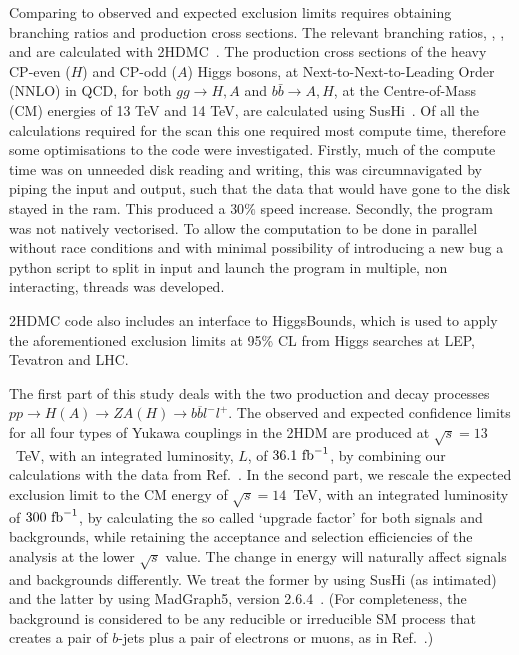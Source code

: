 Comparing to observed and expected exclusion limits requires obtaining branching ratios and production cross sections.
The relevant branching ratios, \AZH{}, \HZA{}, \Abb{} and \Hbb{} are calculated with 2HDMC~\cite{Eriksson20102HDMC}.
The production cross sections of the heavy CP-even ($H$) and CP-odd ($A$) Higgs bosons,
at Next-to-Next-to-Leading Order (NNLO) in QCD, 
for both $gg\to H,A$ and $b\bar b\to A,H$, at the Centre-of-Mass (CM) energies of 13 TeV and 14 TeV,
are calculated using SusHi~\cite{Harlander2013SusHi, Harlander2017Bento, Harlander2002nexttonext, Harlander:2003ai}. 
Of all the calculations required for the scan this one required most compute time,
therefore some optimisations to the code were investigated.
Firstly, much of the compute time was on unneeded disk reading and writing,
this was circumnavigated by piping the input and output,
such that the data that would have gone to the disk stayed in the ram.
This produced a \(30\%\) speed increase.
Secondly, the program was not natively vectorised.
To allow the computation to be done in parallel without race conditions
and with minimal possibility of introducing a new bug
a python script to split in input and launch the program in multiple,
non interacting, threads was developed.

2HDMC code also includes an interface to HiggsBounds, which is used to apply the aforementioned exclusion limits at 95\% CL from Higgs searches at LEP, Tevatron and LHC.

The first part of this study deals with the two production and decay processes \(pp \rightarrow H(A) \rightarrow ZA(H)\rightarrow b\overline{b}l^{-}l^{+}\).
The observed and expected confidence limits for all four types of Yukawa couplings in the 2HDM are produced at \(\sqrt{s}=13\)~TeV, with an integrated luminosity, $L$, of \(36.1~{\rm fb}^{-1}\),
by combining our calculations with the data from Ref.~\cite{Aaboud2018AZHbbll}. 
In the second part, we rescale the expected exclusion limit to the CM energy of \(\sqrt{s}=14\)~TeV,
with an integrated luminosity of \(300~{\rm fb}^{-1}\), by calculating the so called `upgrade factor' for both signals and backgrounds, while retaining the acceptance and selection efficiencies of the analysis at the lower $\sqrt s$ value. The change in energy will naturally affect signals and backgrounds differently. We treat the former by using SusHi (as intimated) and the latter by  using {MadGraph5, version 2.6.4}~\cite{alwall_madgraph2011}. (For completeness, the
 background is considered to be any reducible or irreducible SM process that creates a pair of $b$-jets plus a pair of electrons or muons, as in Ref.~\cite{Aaboud2018AZHbbll}.)

